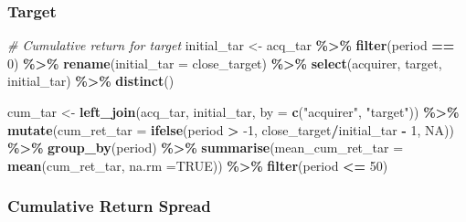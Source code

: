 \documentclass[
]{article}
\newenvironment{Shaded}{\begin{snugshade}}{\end{snugshade}}
\newcommand{\CommentTok}[1]{\textcolor[rgb]{0.56,0.35,0.01}{\textit{#1}}}
\newcommand{\DataTypeTok}[1]{\textcolor[rgb]{0.13,0.29,0.53}{#1}}
\newcommand{\DecValTok}[1]{\textcolor[rgb]{0.00,0.00,0.81}{#1}}
\newcommand{\KeywordTok}[1]{\textcolor[rgb]{0.13,0.29,0.53}{\textbf{#1}}}
\newcommand{\NormalTok}[1]{#1}
\newcommand{\OperatorTok}[1]{\textcolor[rgb]{0.81,0.36,0.00}{\textbf{#1}}}
\newcommand{\OtherTok}[1]{\textcolor[rgb]{0.56,0.35,0.01}{#1}}
\newcommand{\StringTok}[1]{\textcolor[rgb]{0.31,0.60,0.02}{#1}}
\begin{document}
\hypertarget{target}{%
\subsubsection{Target}\label{target}}

\begin{Shaded}
\begin{Highlighting}[]
\CommentTok{\# Cumulative return for target}
\NormalTok{initial\_tar \textless{}{-}}\StringTok{ }\NormalTok{acq\_tar }\OperatorTok{\%\textgreater{}\%}
\StringTok{  }\KeywordTok{filter}\NormalTok{(period }\OperatorTok{==}\StringTok{ }\DecValTok{0}\NormalTok{) }\OperatorTok{\%\textgreater{}\%}
\StringTok{  }\KeywordTok{rename}\NormalTok{(}\DataTypeTok{initial\_tar =}\NormalTok{ close\_target) }\OperatorTok{\%\textgreater{}\%}
\StringTok{  }\KeywordTok{select}\NormalTok{(acquirer, target, initial\_tar) }\OperatorTok{\%\textgreater{}\%}\StringTok{ }
\StringTok{  }\KeywordTok{distinct}\NormalTok{()}

\NormalTok{cum\_tar \textless{}{-}}\StringTok{ }\KeywordTok{left\_join}\NormalTok{(acq\_tar, initial\_tar, }\DataTypeTok{by =} \KeywordTok{c}\NormalTok{(}\StringTok{"acquirer"}\NormalTok{, }\StringTok{"target"}\NormalTok{)) }\OperatorTok{\%\textgreater{}\%}
\StringTok{  }\KeywordTok{mutate}\NormalTok{(}\DataTypeTok{cum\_ret\_tar =} \KeywordTok{ifelse}\NormalTok{(period }\OperatorTok{\textgreater{}}\StringTok{ }\DecValTok{{-}1}\NormalTok{, close\_target}\OperatorTok{/}\NormalTok{initial\_tar }\OperatorTok{{-}}\StringTok{ }\DecValTok{1}\NormalTok{, }\OtherTok{NA}\NormalTok{)) }\OperatorTok{\%\textgreater{}\%}
\StringTok{  }\KeywordTok{group\_by}\NormalTok{(period) }\OperatorTok{\%\textgreater{}\%}
\StringTok{  }\KeywordTok{summarise}\NormalTok{(}\DataTypeTok{mean\_cum\_ret\_tar =} \KeywordTok{mean}\NormalTok{(cum\_ret\_tar, }\DataTypeTok{na.rm =}\OtherTok{TRUE}\NormalTok{)) }\OperatorTok{\%\textgreater{}\%}
\StringTok{  }\KeywordTok{filter}\NormalTok{(period }\OperatorTok{\textless{}=}\StringTok{ }\DecValTok{50}\NormalTok{)}
\end{Highlighting}
\end{Shaded}

\hypertarget{cumulative-return-spread}{%
\subsubsection{Cumulative Return
Spread}\label{cumulative-return-spread}}
\end{document}
